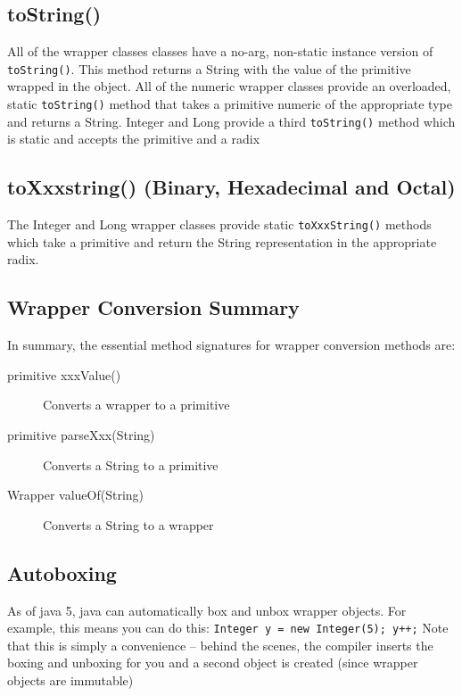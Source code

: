 \subsection{toString()}
All of the wrapper classes classes have a no-arg, non-static instance version 
of \verb#toString()#. This method returns a String with the value of the 
primitive wrapped in the object. All of the numeric wrapper classes provide an 
overloaded, static \verb#toString()# method that takes a primitive numeric of 
the appropriate type and returns a String. Integer and Long provide a third 
\verb#toString()# method which is static and accepts the primitive and a radix

\subsection{toXxxstring() (Binary, Hexadecimal and Octal)}
The Integer and Long wrapper classes provide static \verb#toXxxString()# 
methods which take a primitive and return the String representation in the 
appropriate radix.

\subsection{Wrapper Conversion Summary}
In summary, the essential method signatures for wrapper conversion methods are:
\begin{description}
    \item[primitive xxxValue()] Converts a wrapper to a primitive
    \item[primitive parseXxx(String)] Converts a String to a primitive
    \item[Wrapper valueOf(String)] Converts a String to a wrapper
\end{description}

\subsection{Autoboxing}
As of java 5, java can automatically box and unbox wrapper objects. For 
example, this means you can do this: \verb#Integer y = new Integer(5); y++;# 
Note that this is simply a convenience -- behind the scenes, the compiler 
inserts the boxing and unboxing for you and a second object is created (since 
wrapper objects are immutable)

